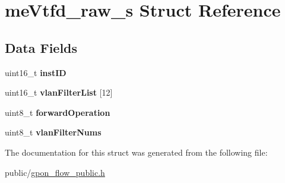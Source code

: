 \hypertarget{structmeVtfd__raw__s}{}\section{me\+Vtfd\+\_\+raw\+\_\+s Struct Reference}
\label{structmeVtfd__raw__s}
\subsection*{Data Fields}
\begin{DoxyCompactItemize}
\item 
\mbox{\label{structmeVtfd__raw__s_a6f6e1e2220c82f50a8a9f6740a17afa7}} 
uint16\+\_\+t {\bfseries inst\+ID}
\item 
\mbox{\label{structmeVtfd__raw__s_a951546431b33053414c6a71dc599c464}} 
uint16\+\_\+t {\bfseries vlan\+Filter\+List} \mbox{[}12\mbox{]}
\item 
\mbox{\label{structmeVtfd__raw__s_a1b5c6124a3c013ed155452e57aa99c5b}} 
uint8\+\_\+t {\bfseries forward\+Operation}
\item 
\mbox{\label{structmeVtfd__raw__s_aa87be050f14bcd3895db9a5466585062}} 
uint8\+\_\+t {\bfseries vlan\+Filter\+Nums}
\end{DoxyCompactItemize}


The documentation for this struct was generated from the following file\+:\begin{DoxyCompactItemize}
\item 
public/\hyperlink{gpon__flow__public_8h}{gpon\+\_\+flow\+\_\+public.\+h}\end{DoxyCompactItemize}
